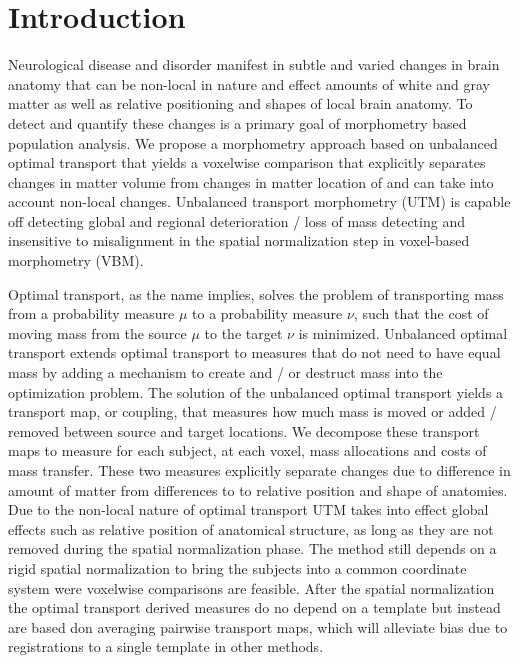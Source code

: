\documentclass{llncs}
\begin{document}
\section{Introduction}
Neurological disease and disorder manifest in subtle and varied changes in
brain anatomy that can be non-local in nature and effect amounts of white and
gray matter as well as relative positioning and shapes of local brain anatomy.
To detect and quantify these changes is a primary goal of morphometry based
population analysis. We propose a morphometry approach based on unbalanced
optimal transport that yields a voxelwise comparison that explicitly separates
changes in matter volume from changes in matter location of and can take into
account non-local changes. Unbalanced transport morphometry (UTM) is capable
off detecting global and regional deterioration / loss of mass detecting and
insensitive to misalignment in the spatial normalization step in voxel-based
morphometry (VBM). 

Optimal transport, as the name implies, solves the problem of transporting mass
from a probability measure $\mu$ to a probability measure $\nu$, such that the
cost of moving mass from the source $\mu$ to the target $\nu$ is minimized.
Unbalanced optimal transport extends optimal transport to measures that do not
need to have equal mass by adding a mechanism to create and / or destruct mass
into the optimization problem. The solution of the unbalanced optimal transport
yields a transport map, or coupling, that measures how much mass is moved or
added / removed between source and target locations. We decompose these
transport maps to measure for each subject, at each voxel, mass allocations and
costs of mass transfer. These two measures explicitly separate changes due to
difference in amount of matter from differences to to relative position and
shape of anatomies. Due to the non-local nature of optimal transport UTM takes
into effect global effects such as relative position of anatomical structure,
as long as they are not removed during the spatial normalization phase. The
method still depends on a rigid spatial normalization to bring the subjects
into a common coordinate system were voxelwise comparisons are feasible. After
the spatial normalization the optimal transport derived measures do no depend
on a template but instead are based don averaging pairwise transport maps,
which will alleviate bias due to registrations to a single template  in other
methods. 
\end{document}
